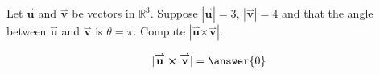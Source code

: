 \documentclass{ximera}
\author{Gregory Hartman \and Matthew Carr}
\begin{document}
\begin{exercise}
Let $\overset{\boldsymbol{\rightharpoonup}}{\mathbf{u}}$ and $\overset{\boldsymbol{\rightharpoonup}}{\mathbf{v}}$ be vectors in $\mathbb{R}^3$. Suppose
$|\overset{\boldsymbol{\rightharpoonup}}{\mathbf{u}}|=3$, $|\overset{\boldsymbol{\rightharpoonup}}{\mathbf{v}}|=4$ and that the angle between $\overset{\boldsymbol{\rightharpoonup}}{\mathbf{u}}$ and
$\overset{\boldsymbol{\rightharpoonup}}{\mathbf{v}}$ is $\theta=\pi$. Compute $|\overset{\boldsymbol{\rightharpoonup}}{\mathbf{u}} \boldsymbol\times \overset{\boldsymbol{\rightharpoonup}}{\mathbf{v}}|$.

\begin{prompt}
\[
|\overset{\boldsymbol{\rightharpoonup}}{\mathbf{u}} \boldsymbol\times \overset{\boldsymbol{\rightharpoonup}}{\mathbf{v}}|=\answer{0}
\]
\end{prompt}


\end{exercise}
\end{document}
